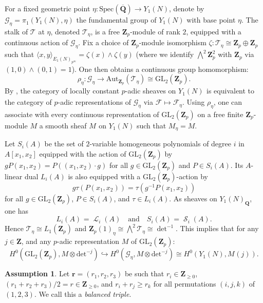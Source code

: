 \documentclass[10pt,letterpaper]{amsart}
\theoremstyle{plain}
\theoremstyle{definition}
\newtheorem{assumption}{Assumption}[section]
\theoremstyle{definition}
\theoremstyle{plain}
\theoremstyle{plain}
\theoremstyle{plain}
\theoremstyle{remark}
\numberwithin{equation}{section}
\DeclareMathOperator{\et}{\acute{e}t}
\DeclareMathOperator{\Ll}{\mathscr{L}}
\DeclareMathOperator{\Ss}{\mathscr{S}}
\newcommand{\Q}{\mathbf{Q}}
\newcommand{\Z}{\mathbf{Z}}
\begin{document}
For a fixed geometric point $\eta:\text{Spec}(\overline{\Q})\rightarrow Y_1(N)$, denote by $\mathcal{G}_{\eta}=\pi_1^{\et}(Y_1(N),\eta)$ the fundamental group of $Y_1(N)$ with base point $\eta$. The stalk of $\mathscr{T}$ at $\eta$, denoted $\mathscr{T}_{\eta}$, is a free $\Z_p$-module of rank $2$, equipped with a continuous action of $\mathcal{G}_{\eta}$. Fix a choice of $\Z_p$-module isomorphism $\zeta:\mathscr{T}_{\eta}\cong \Z_p\oplus \Z_p$ such that $\langle x,y\rangle_{E_1(N)_{p^{\infty}}}=\zeta(x)\wedge \zeta(y)$ (where we identify $\bigwedge^2 \Z_p^2$ with $\Z_p$ via $(1,0)\wedge (0,1) = 1$). One then obtains a continuous group homomorphism:
\begin{equation*}
    \rho_{\eta}:\mathcal{G}_{\eta}\rightarrow \text{Aut}_{\Z_p}(\mathscr{T}_{\eta})\cong {\mathrm{GL}}_2(\Z_p).
\end{equation*}
By \cite[Prop.~A I.8]{FK}, the category of locally constant $p$-adic sheaves on $Y_1(N)_{\et}$ is equivalent to the category of $p$-adic representations of $\mathcal{G}_{\eta}$ via  $\mathscr{F}\mapsto \mathscr{F}_{\eta}$. Using $\rho_{\eta}$, one can associate with every continuous representation of ${\mathrm{GL}}_2(\Z_p)$ on a free finite $\Z_p$-module $M$ a smooth sheaf $M^{\et}$ on $Y_1(N)$ such that $M^{\et}_{\eta}=M$.

Let $S_i(A)$ be the set of $2$-variable homogeneous polynomials of degree $i$ in $A[x_1,x_2]$ equipped with the action of ${\mathrm{GL}}_2(\Z_p)$ by $gP(x_1,x_2)=P((x_1,x_2)\cdot g)$ for all $g\in{\mathrm{GL}}_2(\Z_p)$ and $P\in S_i(A)$. Its $A$-linear dual $L_i(A)$ is also equipped with a ${\mathrm{GL}}_2(\Z_p)$-action by \[g\tau(P(x_1,x_2))=\tau(g^{-1}P(x_1,x_2))\] for all $g\in{\mathrm{GL}}_2(\Z_p)$, $P\in S_i(A)$, and $\tau\in L_i(A)$. As sheaves on $Y_1(N)_{\Q}$, one has
\begin{equation}
    L_i(A)^{\et}=\Ll_i(A) \quad \text{and} \quad S_i(A)^{\et}=\Ss_i(A).\nonumber
\end{equation}
Hence $\mathscr{T}_{\eta}\cong L_1(\Z_p)$ and $\Z_p(1)_{\eta}\cong\bigwedge^2\mathscr{T}_{\eta}\cong \det^{-1}$. This implies that for any $j\in \Z$, and any $p$-adic representation $M$ of ${\mathrm{GL}}_2(\Z_p)$:
\begin{equation}\label{equation33}
    H^0({\mathrm{GL}}_2(\Z_p),M\otimes \text{det}^{-j})\hookrightarrow H^0(\mathcal{G}_{\eta},M\otimes \text{det}^{-j})\cong H^0_{\et}(Y_1(N),M^{\et}(j)).
\end{equation}

\begin{assumption}\label{assumption2.2}
Let $\mathbf{r}=(r_1,r_2,r_3)$ be such that $r_i\in\Z_{\ge 0}$, $(r_1+r_2+r_3)/2=r\in\Z_{\ge 0}$, and $r_i+r_j\ge r_k$ for all permutations $(i,j,k)$ of $(1,2,3)$. We call this a \emph{balanced triple}. 
\end{assumption}
\end{document}

